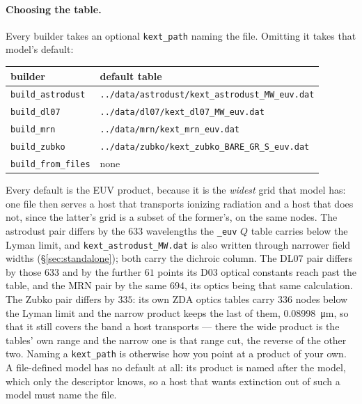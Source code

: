 \documentclass{my_memo}
\newcommand{\code}[1]{\texttt{#1}}
\begin{document}
\paragraph{Choosing the table.}\label{par:kextpath} Every builder takes an
optional \code{kext\_path} naming the file. Omitting it takes that model's
default:

\begin{center}
\begin{tabular}{@{}ll@{}}
\toprule
builder & default table \\
\midrule
\code{build\_astrodust}  & \code{../data/astrodust/kext\_astrodust\_MW\_euv.dat} \\
\code{build\_dl07}       & \code{../data/dl07/kext\_dl07\_MW\_euv.dat} \\
\code{build\_mrn}        & \code{../data/mrn/kext\_mrn\_euv.dat} \\
\code{build\_zubko}      & \code{../data/zubko/kext\_zubko\_BARE\_GR\_S\_euv.dat} \\
\code{build\_from\_files}& none \\
\bottomrule
\end{tabular}
\end{center}

\noindent Every default is the EUV product, because it is the \emph{widest}
grid that model has: one file then serves a host that transports ionizing
radiation and a host that does not, since the latter's grid is a subset of the
former's, on the same nodes. The astrodust pair differs by the $633$ wavelengths
the \code{\_euv} $Q$ table carries below the Lyman limit, and
\code{kext\_astrodust\_MW.dat} is also written through narrower field widths
(\S\ref{sec:standalone}); both carry the dichroic column. The DL07 pair differs
by those $633$ and by the further $61$ points its D03 optical constants reach
past the table, and the MRN pair by the same $694$, its optics being that same
calculation. The Zubko pair differs by $335$: its own ZDA optics tables carry
$336$ nodes below the Lyman limit and the narrow product keeps the last of them,
\SI{0.08998}{\micro\meter}, so that it still covers the band a host transports
--- there the wide product is the
tables' own range and the narrow one is that range cut, the reverse of the
other two. Naming a \code{kext\_path} is otherwise how you point at a
product of your own. A file-defined model has no default at all: its product is
named after the model, which only the descriptor knows, so a host that wants
extinction out of such a model must name the file.
\end{document}
